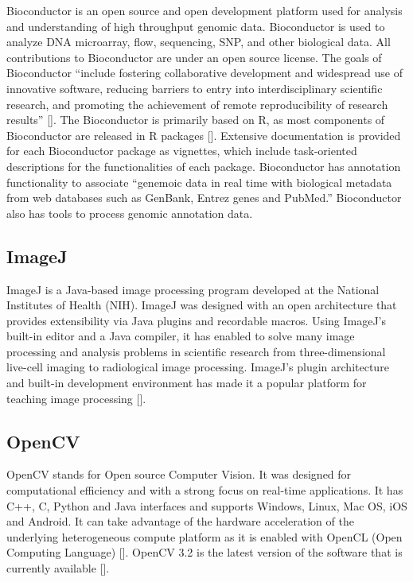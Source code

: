 Bioconductor is an open source and open development platform used for
analysis and understanding of high throughput genomic
data. Bioconductor is used to analyze DNA microarray, flow,
sequencing, SNP, and other biological data. All contributions to
Bioconductor are under an open source license. The goals of
Bioconductor ``include fostering collaborative development and
widespread use of innovative software, reducing barriers to entry into
interdisciplinary scientific research, and promoting the achievement
of remote reproducibility of research
results'' [\cite{bioconductor-article-2004}].  The Bioconductor is
primarily based on R, as most components of Bioconductor are released
in R packages [\cite{www-bioconductor-about}].  Extensive documentation
is provided for each Bioconductor package as vignettes, which include
task-oriented descriptions for the functionalities of each
package. Bioconductor has annotation functionality to associate
``genemoic data in real time with biological metadata from web
databases such as GenBank, Entrez genes and PubMed.''  Bioconductor
also has tools to process genomic annotation data.



\subsection{ImageJ}

ImageJ is a Java-based image processing program developed at the
National Institutes of Health (NIH). ImageJ was designed with an open
architecture that provides extensibility via Java plugins and
recordable macros.  Using ImageJ's built-in editor and a Java
compiler, it has enabled to solve many image processing and analysis
problems in scientific research from three-dimensional live-cell
imaging to radiological image processing.  ImageJ's plugin
architecture and built-in development environment has made it a
popular platform for teaching image processing [\cite{www-imagej}].

\subsection{OpenCV}

OpenCV stands for Open source Computer Vision. It was designed for
computational efficiency and with a strong focus on real-time
applications. It has C++, C, Python and Java interfaces and supports
Windows, Linux, Mac OS, iOS and Android. It can take advantage of the
hardware acceleration of the underlying heterogeneous compute platform
as it is enabled with OpenCL (Open Computing
Language) [\cite{www-opencv}]. OpenCV 3.2 is the latest version of the
software that is currently available [\cite{opencv-version}].

